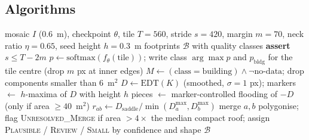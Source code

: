 \documentclass[12pt,a4paper]{article}
\newcommand{\dinoseg}{StrongDINOv2Seg}
\begin{document}
\subsection{Algorithms}
\begin{algorithm}[t]
\caption{Tiled \dinoseg{} inference and distance-transform building extraction (\texttt{run\_tiled\_inference.py}, \texttt{extract\_buildings\_v8.py})}
\label{alg:extract}
\begin{algorithmic}[1]
\Require mosaic $I$ (0.6~m), checkpoint $\theta$, tile $T=560$, stride $s=420$, margin $m=70$, neck ratio $\eta=0.65$, seed height $h=0.3$~m
\Ensure footprints $\mathcal B$ with quality classes
\State \textbf{assert} $s\le T-2m$ 
  \State $p\gets\mathrm{softmax}(f_\theta(\text{tile}))$; write class $\arg\max p$ and $p_{\mathrm{bldg}}$ for the tile centre (drop $m$ px at inner edges)
\EndFor
\State $M\gets(\text{class}=\text{building})\wedge\lnot\text{no-data}$; drop components smaller than 6~m$^2$
  \State $D\gets\mathrm{EDT}(K)$ (smoothed, $\sigma=1$ px); markers $\gets$ $h$-maxima of $D$ with height $h$
  \State pieces $\gets$ marker-controlled flooding of $-D$ (only if area $\ge 40$~m$^2$)
    \State $r_{ab}\gets D_{\mathrm{saddle}}/\min(D_a^{\max},D_b^{\max})$
     merge $a,b$ 
    \EndIf
  \EndFor
\EndFor
\State polygonise; flag \textsc{Unresolved\_Merge} if area $>4\times$ the median compact roof; assign \textsc{Plausible} / \textsc{Review} / \textsc{Small} by confidence and shape
\State \Return $\mathcal B$
\end{algorithmic}
\end{algorithm}
\end{document}
